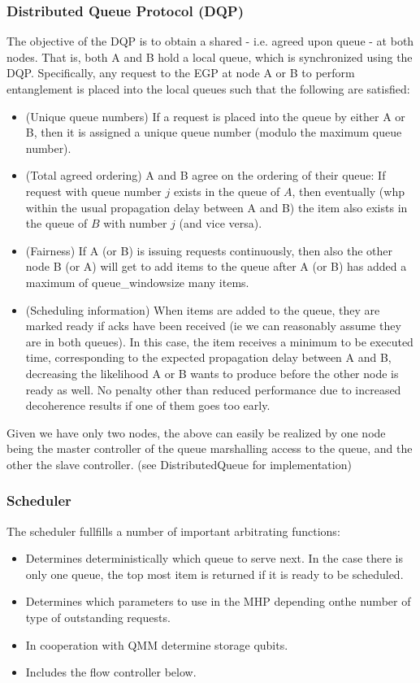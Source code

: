 \documentclass{article}
\begin{document}
\subsubsection{Distributed Queue Protocol (DQP)}
The objective of the DQP is to obtain a shared - i.e. agreed upon queue - at both nodes. That is, both A and B hold a local queue, which is synchronized using the DQP. Specifically, any request to the EGP at node A or B to perform entanglement is placed into the local queues such that the following are satisfied:
\begin{itemize}
\item (Unique queue numbers) If a request is placed into the queue by either A or B, then it is assigned a unique queue number (modulo the maximum queue number).
\item (Total agreed ordering) A and B agree on the ordering of their queue: If request with queue number $j$ exists in the queue of $A$, then eventually (whp within the 
usual propagation delay between A and B) the item also exists in the queue of $B$ with number $j$ (and vice versa).
\item (Fairness) If A (or B) is issuing requests continuously, then also the other node B (or A) will get to add items to the queue after A (or B) has added a maximum of queue\_windowsize many items.
\item (Scheduling information) When items are added to the queue, they are marked ready if acks have been received (ie we can reasonably assume they are in both queues). In this case, the item receives a minimum to be executed time, corresponding to the expected propagation delay between A and B, decreasing the likelihood A or B wants to produce before the other node is ready as well. No penalty other than reduced performance due to increased decoherence results if one of them goes too early.
\end{itemize}
Given we have only two nodes, the above can easily be realized by one node being the master controller of the queue marshalling access to the queue, and the other the slave controller. (see DistributedQueue for implementation)

\subsubsection{Scheduler}
The scheduler fullfills a number of important arbitrating functions:
\begin{itemize}
\item Determines deterministically which queue to serve next. In the case there is only one queue, the top most item is returned if it is ready to be scheduled.
\item Determines which parameters to use in the MHP depending onthe number of type of outstanding requests.
\item In cooperation with QMM determine storage qubits.
\item Includes the flow controller below.
\end{itemize}
\end{document}

